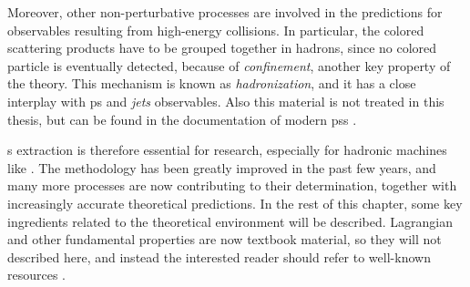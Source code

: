 Moreover, other non-perturbative processes are involved in the predictions for
observables resulting from high-energy collisions.
In particular, the colored scattering products have to be grouped together in
hadrons, since no colored particle is eventually detected, because of \qcd
\textit{confinement}, another key property of the theory.
%
This mechanism is known as \textit{hadronization}, and it has a close interplay
with \acrfull{ps} and \qcd \textit{jets} observables.
%
Also this material is not treated in this thesis, but can be found in the
documentation of modern \acrlong{ps}s \cite{Bierlich:2022pfr,Bellm:2015jjp}.

\pdf{}s extraction is therefore essential for \hep research, especially for
hadronic machines like \lhc.
The methodology has been greatly improved in the past few years, and many more
processes are now contributing to their determination, together with
increasingly accurate theoretical predictions.
%
In the rest of this chapter, some key ingredients related to the \pdf
theoretical environment will be described.
\qcd Lagrangian and other fundamental properties are now textbook material, so
they will not described here, and instead the interested reader should refer to
well-known resources
\cite{Peskin:1995ev,Ellis:1996mzs,Campbell:2017hsr,Collins:2011zzd}.
